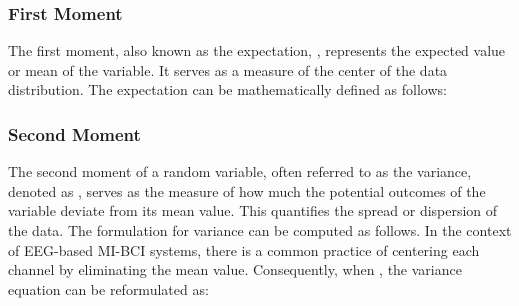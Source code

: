 \subsubsection{First Moment}

The first moment, also known as the expectation, , represents the expected value or mean of the variable. It serves as a measure of the center of the data distribution. The expectation can be mathematically defined as follows:



\subsubsection{Second Moment}

The second moment of a random variable, often referred to as the variance, denoted as , serves as the measure of how much the potential outcomes of the variable deviate from its mean value. This quantifies the spread or dispersion of the data. The formulation for variance can be computed as follows.
In the context of EEG-based MI-BCI systems, there is a common practice of centering each channel by eliminating the mean value. Consequently, when , the variance equation can be reformulated as:


